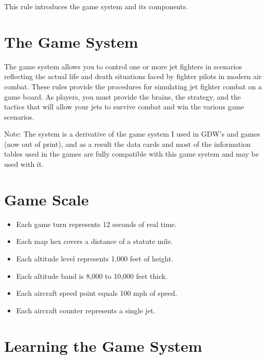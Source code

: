 

This rule introduces the {\AirPow} game system and its components.

\section{The Game System}

The {\AirPow} game system allows you to control one or more jet fighters in scenarios reflecting the actual life and death situations faced by fighter pilots in modern air combat. These rules provide the procedures for simulating jet fighter combat on a game board. As players, you must provide the brains, the strategy, and the tactics that will allow your jets to survive combat and win the various game scenarios.

Note: The {\AirPow} system is a derivative of the game system I used in GDW’s {\AirSup} and {\AirStr} games (now out of print), and as a result the data cards and most of the information tables used in the {\AirSup} games are fully compatible with this game system and may be used with it.

\section{Game Scale}

\begin{itemize}
    \item Each game turn represents 12 seconds of real time.
    \item Each map hex covers a distance of {\onethird} a statute mile.
    \item Each altitude level represents 1,000 feet of height.
    \item Each altitude band is 8,000 to 10,000 feet thick.
    \item Each aircraft speed point equals 100 mph of speed.
    \item Each aircraft counter represents a single jet.
\end{itemize}

\section{Learning the Game System}


